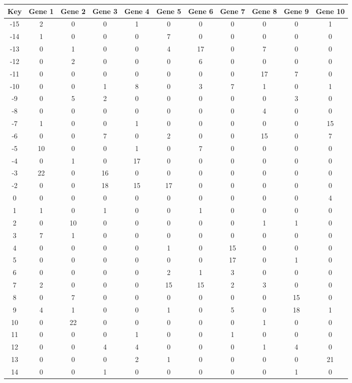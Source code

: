 \begin{tabular}{|c|c|c|c|c|c|c|c|c|c|c|}
\hline
Key & Gene 1 & Gene 2 & Gene 3 & Gene 4 & Gene 5 & Gene 6 & Gene 7 & Gene 8 & Gene 9 & Gene 10 \\
\hline
-15 & 2 & 0 & 0 & 1 & 0 & 0 & 0 & 0 & 0 & 1 \\
-14 & 1 & 0 & 0 & 0 & 7 & 0 & 0 & 0 & 0 & 0 \\
-13 & 0 & 1 & 0 & 0 & 4 & 17 & 0 & 7 & 0 & 0 \\
-12 & 0 & 2 & 0 & 0 & 0 & 6 & 0 & 0 & 0 & 0 \\
-11 & 0 & 0 & 0 & 0 & 0 & 0 & 0 & 17 & 7 & 0 \\
-10 & 0 & 0 & 1 & 8 & 0 & 3 & 7 & 1 & 0 & 1 \\
-9 & 0 & 5 & 2 & 0 & 0 & 0 & 0 & 0 & 3 & 0 \\
-8 & 0 & 0 & 0 & 0 & 0 & 0 & 0 & 4 & 0 & 0 \\
-7 & 1 & 0 & 0 & 1 & 0 & 0 & 0 & 0 & 0 & 15 \\
-6 & 0 & 0 & 7 & 0 & 2 & 0 & 0 & 15 & 0 & 7 \\
-5 & 10 & 0 & 0 & 1 & 0 & 7 & 0 & 0 & 0 & 0 \\
-4 & 0 & 1 & 0 & 17 & 0 & 0 & 0 & 0 & 0 & 0 \\
-3 & 22 & 0 & 16 & 0 & 0 & 0 & 0 & 0 & 0 & 0 \\
-2 & 0 & 0 & 18 & 15 & 17 & 0 & 0 & 0 & 0 & 0 \\
0 & 0 & 0 & 0 & 0 & 0 & 0 & 0 & 0 & 0 & 4 \\
1 & 1 & 0 & 1 & 0 & 0 & 1 & 0 & 0 & 0 & 0 \\
2 & 0 & 10 & 0 & 0 & 0 & 0 & 0 & 1 & 1 & 0 \\
3 & 7 & 1 & 0 & 0 & 0 & 0 & 0 & 0 & 0 & 0 \\
4 & 0 & 0 & 0 & 0 & 1 & 0 & 15 & 0 & 0 & 0 \\
5 & 0 & 0 & 0 & 0 & 0 & 0 & 17 & 0 & 1 & 0 \\
6 & 0 & 0 & 0 & 0 & 2 & 1 & 3 & 0 & 0 & 0 \\
7 & 2 & 0 & 0 & 0 & 15 & 15 & 2 & 3 & 0 & 0 \\
8 & 0 & 7 & 0 & 0 & 0 & 0 & 0 & 0 & 15 & 0 \\
9 & 4 & 1 & 0 & 0 & 1 & 0 & 5 & 0 & 18 & 1 \\
10 & 0 & 22 & 0 & 0 & 0 & 0 & 0 & 1 & 0 & 0 \\
11 & 0 & 0 & 0 & 1 & 0 & 0 & 1 & 0 & 0 & 0 \\
12 & 0 & 0 & 4 & 4 & 0 & 0 & 0 & 1 & 4 & 0 \\
13 & 0 & 0 & 0 & 2 & 1 & 0 & 0 & 0 & 0 & 21 \\
14 & 0 & 0 & 1 & 0 & 0 & 0 & 0 & 0 & 1 & 0 \\
\hline
\end{tabular}